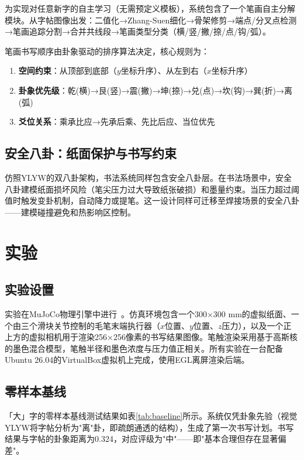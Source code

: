 为实现对任意新字的自主学习（无需预定义模板），系统包含了一个笔画自主分解模块。从字帖图像出发：二值化→Zhang-Suen细化→骨架修剪→端点/分叉点检测→笔画追踪分割→合并共线段→笔画类型分类（横/竖/撇/捺/点/钩/弧）。

笔画书写顺序由卦象驱动的排序算法决定，核心规则为：
\begin{enumerate}[nosep]
\item \textbf{空间约束}：从顶部到底部（$y$坐标升序）、从左到右（$x$坐标升序）
\item \textbf{卦象优先级}：乾(横)→艮(竖)→震(撇)→坤(捺)→兑(点)→坎(钩)→巽(折)→离(弧)
\item \textbf{爻位关系}：乘承比应→先承后乘、先比后应、当位优先
\end{enumerate}

\subsection{安全八卦：纸面保护与书写约束}

仿照YLYW的双八卦架构，书法系统同样包含安全八卦层。在书法场景中，安全八卦建模纸面损坏风险（笔尖压力过大导致纸张破损）和墨量约束。当压力超过阈值时触发变卦机制，自动降力或提笔。这一设计同样可迁移至焊接场景的安全八卦——建模碰撞避免和热影响区控制。

\section{实验}

\subsection{实验设置}

实验在MuJoCo物理引擎中进行~\cite{todorov2012mujoco}。仿真环境包含一个300×300 mm的虚拟纸面、一个由三个滑块关节控制的毛笔末端执行器（$x$位置、$y$位置、$z$压力），以及一个正上方的虚拟相机用于渲染256×256像素的书写结果图像。笔触渲染采用基于高斯核的墨色混合模型，笔触半径和墨色浓度与压力值正相关。所有实验在一台配备Ubuntu 26.04的VirtualBox虚拟机上完成，使用EGL离屏渲染后端。

\subsection{零样本基线}

「大」字的零样本基线测试结果如表\ref{tab:baseline}所示。系统仅凭卦象先验（视觉YLYW将字帖分析为"离"卦，即疏朗通透的结构），生成了第一次书写计划。书写结果与字帖的卦象距离为0.324，对应评级为"中"——即"基本合理但存在显著偏差"。

